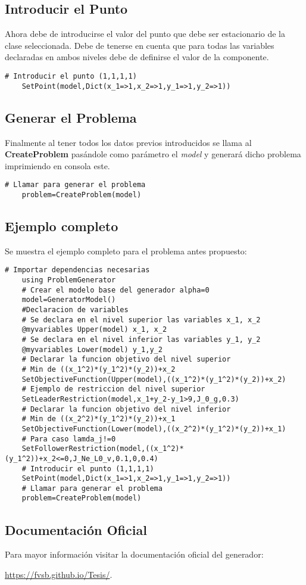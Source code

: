 \subsection{Introducir el Punto}
Ahora debe de introducirse el valor del punto que debe ser estacionario de la clase seleccionada.
Debe de tenerse en cuenta que para todas las variables declaradas en ambos niveles debe de definirse el valor de la componente.

\begin{lstlisting}[caption={Introducir el punto $(1,1,1,1)$}]
    # Introducir el punto (1,1,1,1)
    SetPoint(model,Dict(x_1=>1,x_2=>1,y_1=>1,y_2=>1))
\end{lstlisting}

\subsection{Generar el Problema}
Finalmente al tener todos los datos previos introducidos se llama al \textbf{CreateProblem} pasándole como parámetro el \textit{model} 
y generará dicho problema imprimiendo en consola este.

\begin{lstlisting}[caption={Generar el problema}]
    # Llamar para generar el problema
    problem=CreateProblem(model)
\end{lstlisting}

    
\subsection{Ejemplo completo}
Se muestra el ejemplo completo para el problema antes propuesto:
\begin{lstlisting}[caption={Script}]
    # Importar dependencias necesarias
    using ProblemGenerator
    # Crear el modelo base del generador alpha=0
    model=GeneratorModel()
    #Declaracion de variables
    # Se declara en el nivel superior las variables x_1, x_2
    @myvariables Upper(model) x_1, x_2
    # Se declara en el nivel inferior las variables y_1, y_2
    @myvariables Lower(model) y_1,y_2
    # Declarar la funcion objetivo del nivel superior
    # Min de ((x_1^2)*(y_1^2)*(y_2))+x_2
    SetObjectiveFunction(Upper(model),((x_1^2)*(y_1^2)*(y_2))+x_2)
    # Ejemplo de restriccion del nivel superior
    SetLeaderRestriction(model,x_1+y_2-y_1>9,J_0_g,0.3)
    # Declarar la funcion objetivo del nivel inferior
    # Min de ((x_2^2)*(y_1^2)*(y_2))+x_1
    SetObjectiveFunction(Lower(model),((x_2^2)*(y_1^2)*(y_2))+x_1)
    # Para caso lamda_j!=0
    SetFollowerRestriction(model,((x_1^2)*(y_1^2))+x_2<=0,J_Ne_L0_v,0.1,0,0.4)
    # Introducir el punto (1,1,1,1)
    SetPoint(model,Dict(x_1=>1,x_2=>1,y_1=>1,y_2=>1))
    # Llamar para generar el problema
    problem=CreateProblem(model)
\end{lstlisting}


\subsection{Documentación Oficial}
Para mayor información visitar la documentación oficial del generador:

\begin{center}
\href{https://fvsb.github.io/Tesis/}{https://fvsb.github.io/Tesis/}. 
\end{center}
